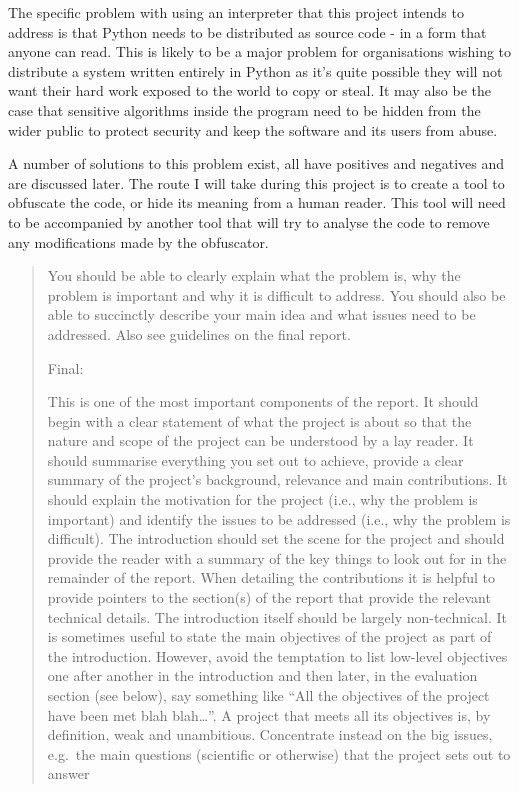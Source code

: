 \documentclass{report}
\begin{document}
The specific problem with using an interpreter that this project
intends to address is that Python needs to be distributed as source
code - in a form that anyone can read. This is likely to be a major
problem for organisations wishing to distribute a system written
entirely in Python as it's quite possible they will not want their
hard work exposed to the world to copy or steal. It may also be the
case that sensitive algorithms inside the program need to be hidden
from the wider public to protect security and keep the software and
its users from abuse.

A number of solutions to this problem exist, all have positives and
negatives and are discussed later. The route I will take during
this project is to create a tool to obfuscate the code, or hide its
meaning from a human reader. This tool will need to be accompanied
by another tool that will try to analyse the code to remove any
modifications made by the obfuscator.

\begin{quote}
You should be able to clearly explain what the problem is, why the
problem is important and why it is difficult to address. You should
also be able to succinctly describe your main idea and what issues
need to be addressed. Also see guidelines on the final report.

Final:

This is one of the most important components of the report. It
should begin with a clear statement of what the project is about so
that the nature and scope of the project can be understood by a lay
reader. It should summarise everything you set out to achieve,
provide a clear summary of the project's background, relevance and
main contributions. It should explain the motivation for the
project (i.e., why the problem is important) and identify the
issues to be addressed (i.e., why the problem is difficult). The
introduction should set the scene for the project and should
provide the reader with a summary of the key things to look out for
in the remainder of the report. When detailing the contributions it
is helpful to provide pointers to the section(s) of the report that
provide the relevant technical details. The introduction itself
should be largely non-technical. It is sometimes useful to state
the main objectives of the project as part of the introduction.
However, avoid the temptation to list low-level objectives one
after another in the introduction and then later, in the evaluation
section (see below), say something like
``All the objectives of the project have been met blah blah\ldots{}''.
A project that meets all its objectives is, by definition, weak and
unambitious. Concentrate instead on the big issues, e.g.~the main
questions (scientific or otherwise) that the project sets out to
answer

\end{quote}
\end{document}

